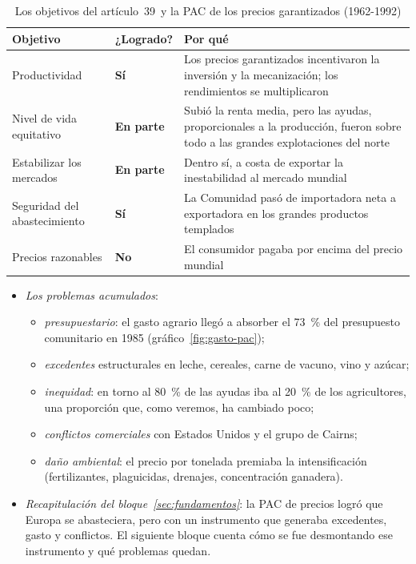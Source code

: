 \documentclass[11pt]{article}
\begin{document}
\begin{table}[H]
\centering
\caption{Los objetivos del artículo~39~y la PAC de los precios garantizados (1962-1992)}\label{tab:objetivos-1992}
\small
\begin{tabular}{>{\raggedright\arraybackslash}m{4.6cm}>{\centering\arraybackslash}m{1.6cm}>{\raggedright\arraybackslash}m{8.0cm}}
\toprule
\rowcolor{tceeazulpalido} \textbf{Objetivo} & \textbf{¿Logrado?} & \textbf{Por qué}\\
\midrule
Productividad & \textcolor{tceeverde}{\textbf{Sí}} & Los precios garantizados incentivaron la inversión y la mecanización; los rendimientos se multiplicaron\\
\addlinespace[0.2em]
Nivel de vida equitativo & \textcolor{tceedorado}{\textbf{En parte}} & Subió la renta media, pero las ayudas, proporcionales a la producción, fueron sobre todo a las grandes explotaciones del norte\\
\addlinespace[0.2em]
Estabilizar los mercados & \textcolor{tceedorado}{\textbf{En parte}} & Dentro sí, a costa de exportar la inestabilidad al mercado mundial\\
\addlinespace[0.2em]
Seguridad del abastecimiento & \textcolor{tceeverde}{\textbf{Sí}} & La Comunidad pasó de importadora neta a exportadora en los grandes productos templados\\
\addlinespace[0.2em]
Precios razonables & \textcolor{tceerojo}{\textbf{No}} & El consumidor pagaba por encima del precio mundial\\
\bottomrule
\end{tabular}
\end{table}

\begin{itemize}
\item \emph{Los problemas acumulados}:
  \begin{itemize}
  \item \emph{presupuestario}: el gasto agrario llegó a absorber el 73~\% del presupuesto comunitario en 1985 (gráfico~\ref{fig:gasto-pac});
  \item \emph{excedentes} estructurales en leche, cereales, carne de vacuno, vino y azúcar;
  \item \emph{inequidad}: en torno al 80~\% de las ayudas iba al 20~\% de los agricultores, una proporción que, como veremos, ha cambiado poco;
  \item \emph{conflictos comerciales} con Estados Unidos y el grupo de Cairns;
  \item \emph{daño ambiental}: el precio por tonelada premiaba la intensificación (fertilizantes, plaguicidas, drenajes, concentración ganadera).
  \end{itemize}
\item \emph{Recapitulación del bloque~\ref{sec:fundamentos}}: la PAC de precios logró que Europa se abasteciera, pero con un instrumento que generaba excedentes, gasto y conflictos. El siguiente bloque cuenta cómo se fue desmontando ese instrumento y qué problemas quedan.
\end{itemize}
\end{document}
